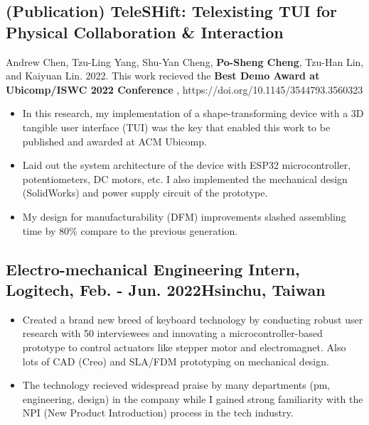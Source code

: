 \documentclass[12pt]{article}
\begin{document}
    \subsection*{(Publication) TeleSHift: Telexisting TUI for Physical Collaboration \& Interaction}
    { \small
    {\scriptsize Andrew Chen, Tzu-Ling Yang, Shu-Yan Cheng, \textbf{Po-Sheng Cheng}, Tzu-Han Lin, and Kaiyuan Lin. 2022. This work recieved the \textbf{Best Demo Award at Ubicomp/ISWC 2022 Conference}%
    , https://doi.org/10.1145/3544793.3560323}
        \begin{itemize}
            \item In this research, my implementation of a shape-transforming device with a 3D tangible user interface (TUI) was the key that enabled this work to be published and awarded at ACM Ubicomp.
            \item Laid out the system architecture of the device with ESP32 microcontroller, potentiometers, DC motors, etc. I also implemented the mechanical design (SolidWorks) and power supply circuit of the prototype.
            \item My design for manufacturability (DFM) improvements slashed assembling time by 80\% compare to the previous generation.
        \end{itemize}
        }
    
        \subsection*{Electro-mechanical Engineering Intern, Logitech, Feb. - Jun. 2022\hfill Hsinchu, Taiwan}
        { \small
        \begin{itemize}
            \item Created a brand new breed of keyboard technology by conducting robust user research with 50 interviewees and innovating a microcontroller-based prototype to control actuators like stepper motor and electromagnet. Also lots of CAD (Creo) and SLA/FDM prototyping on mechanical design. 
            \item The technology recieved widespread praise by many departments (pm, engineering, design) in the company while I gained strong familiarity with the NPI (New Product Introduction) process in the tech industry. 
        \end{itemize}
        }
\end{document}
